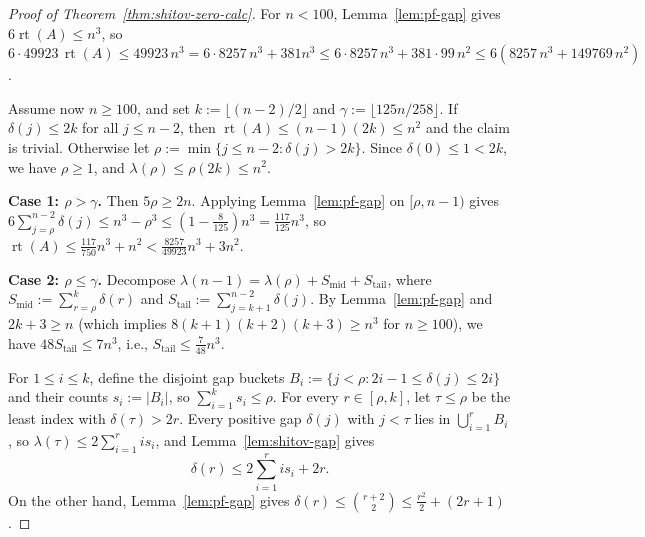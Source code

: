\documentclass[11pt]{article}
\theoremstyle{definition}
\theoremstyle{remark}
\newcommand{\rt}{\operatorname{rt}}
\begin{document}
\begin{proof}[Proof of Theorem~\ref{thm:shitov-zero-calc}]
For $n < 100$, Lemma~\ref{lem:pf-gap} gives $6 \rt(A) \le n^3$, so $6 \cdot 49923\, \rt(A) \le 49923\, n^3 = 6 \cdot 8257\, n^3 + 381 n^3 \le 6 \cdot 8257\, n^3 + 381 \cdot 99\, n^2 \le 6(8257\, n^3 + 149769\, n^2)$.

Assume now $n \ge 100$, and set $k := \lfloor (n - 2)/2 \rfloor$ and $\gamma := \lfloor 125 n / 258 \rfloor$. If $\delta(j) \le 2k$ for all $j \le n - 2$, then $\rt(A) \le (n - 1)(2k) \le n^2$ and the claim is trivial. Otherwise let $\rho := \min \{j \le n - 2 : \delta(j) > 2k\}$. Since $\delta(0) \le 1 < 2k$, we have $\rho \ge 1$, and $\lambda(\rho) \le \rho (2k) \le n^2$.

\smallskip
\noindent\textbf{Case 1: $\rho > \gamma$.}
Then $5 \rho \ge 2 n$. Applying Lemma~\ref{lem:pf-gap} on $[\rho, n - 1)$ gives $6 \sum_{j=\rho}^{n-2} \delta(j) \le n^3 - \rho^3 \le (1 - \frac{8}{125}) n^3 = \frac{117}{125} n^3$, so $\rt(A) \le \frac{117}{750} n^3 + n^2 < \frac{8257}{49923} n^3 + 3 n^2$.

\smallskip
\noindent\textbf{Case 2: $\rho \le \gamma$.}
Decompose $\lambda(n - 1) = \lambda(\rho) + S_{\mathrm{mid}} + S_{\mathrm{tail}}$, where $S_{\mathrm{mid}} := \sum_{r=\rho}^{k} \delta(r)$ and $S_{\mathrm{tail}} := \sum_{j=k+1}^{n-2} \delta(j)$. By Lemma~\ref{lem:pf-gap} and $2k + 3 \ge n$ (which implies $8(k+1)(k+2)(k+3) \ge n^3$ for $n \ge 100$), we have $48 S_{\mathrm{tail}} \le 7 n^3$, i.e., $S_{\mathrm{tail}} \le \frac{7}{48} n^3$.

For $1 \le i \le k$, define the disjoint gap buckets $B_i := \{j < \rho : 2i - 1 \le \delta(j) \le 2i\}$ and their counts $s_i := |B_i|$, so $\sum_{i=1}^k s_i \le \rho$. For every $r \in [\rho, k]$, let $\tau \le \rho$ be the least index with $\delta(\tau) > 2r$. Every positive gap $\delta(j)$ with $j < \tau$ lies in $\bigcup_{i=1}^r B_i$, so $\lambda(\tau) \le 2 \sum_{i=1}^r i s_i$, and Lemma~\ref{lem:shitov-gap} gives
\begin{equation}\label{eq:shitov-bucket}
  \delta(r) \le 2 \sum_{i = 1}^{r} i s_i + 2 r.
\end{equation}
On the other hand, Lemma~\ref{lem:pf-gap} gives $\delta(r) \le \binom{r+2}{2} \le \frac{r^2}{2} + (2r + 1)$.


\end{proof}
\end{document}
